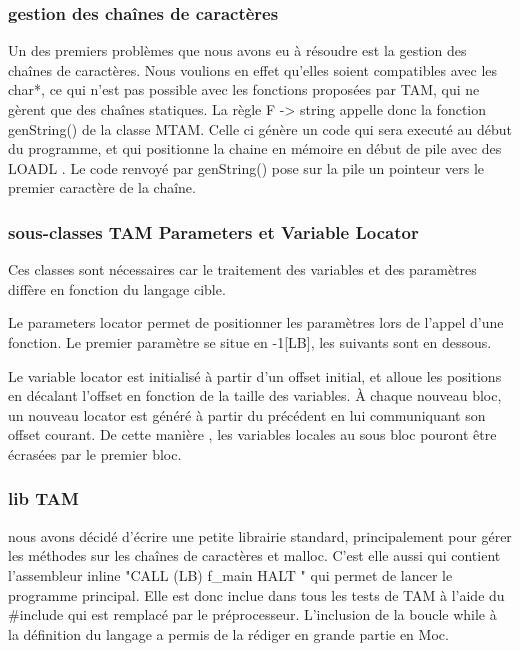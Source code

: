 \documentclass{scrartcl}
\begin{document}
\subsubsection{gestion des chaînes de caractères}

Un des premiers problèmes que nous avons eu à résoudre est la gestion des chaînes de caractères.
Nous voulions en effet qu'elles soient compatibles avec les char*, ce qui n'est pas possible 
avec les fonctions proposées par TAM, qui ne gèrent que des chaînes statiques.
La règle  F -> string appelle donc la  fonction genString() de la classe MTAM.
Celle ci génère un code qui sera executé au début du programme, et qui positionne la chaine en mémoire 
en début de pile avec des LOADL . Le code renvoyé par genString() pose sur la pile un pointeur vers le 
premier caractère de la chaîne.

\subsubsection{sous-classes TAM Parameters et Variable Locator}

Ces classes sont nécessaires car le traitement des variables et des paramètres diffère en fonction du langage cible.

Le parameters locator permet de positionner les paramètres lors de l'appel d'une fonction. Le premier paramètre se situe en -1[LB], 
les suivants sont en dessous.

Le variable locator est initialisé à partir d'un offset initial, et alloue les positions en décalant l'offset en fonction de la taille des variables.
À chaque nouveau bloc, un nouveau locator est généré à partir du précédent en lui communiquant son offset courant. De cette manière , les variables locales
au sous bloc pouront être écrasées par le premier bloc.
 

\subsubsection{lib TAM}

nous avons décidé d'écrire une petite librairie standard, principalement pour gérer les méthodes sur les 
chaînes de caractères et malloc. C'est elle aussi qui contient l'assembleur inline "CALL (LB) f\_main 
    HALT " qui permet de lancer le programme principal. Elle est donc inclue dans tous les tests de TAM à l'aide du #include qui est remplacé par le préprocesseur.
L'inclusion de la boucle while à la définition du langage a permis de la rédiger en grande partie en Moc.
\end{document}
